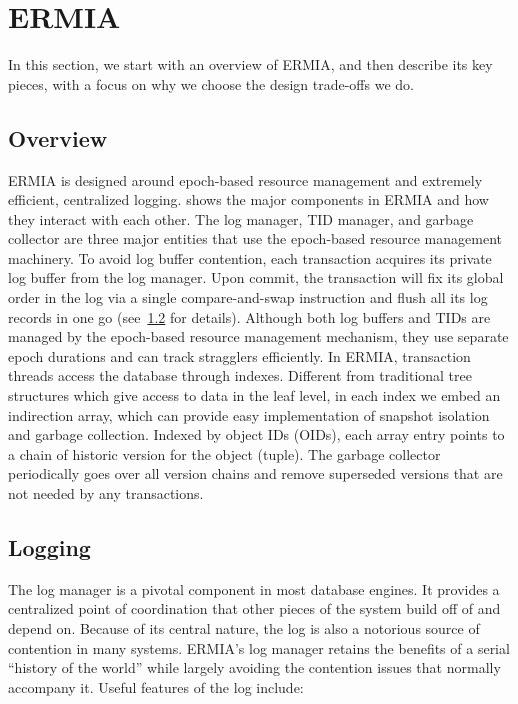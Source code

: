 
\section{ERMIA}
In this section, we start with an overview of ERMIA, and then describe its key pieces, with a focus on why we choose the design trade-offs we do.

\subsection{Overview}
ERMIA is designed around epoch-based resource management and extremely efficient, centralized logging.  shows the major components in ERMIA and how they interact with each other. The log manager, TID manager, and garbage collector are three major entities that use the epoch-based resource management machinery. To avoid log buffer contention, each transaction acquires its private log buffer from the log manager. Upon commit, the transaction will fix its global order in the log via a single compare-and-swap instruction and flush all its log records in one go (see~\ref{subsec:logging} for details). Although both log buffers and TIDs are managed by the epoch-based resource management mechanism, they use separate epoch durations and can track stragglers efficiently. In ERMIA, transaction threads access the database through indexes. Different from traditional tree structures which give access to data in the leaf level, in each index we embed an indirection array, which can provide easy implementation of snapshot isolation and garbage collection. Indexed by object IDs (OIDs), each array entry points to a chain of historic version for the object (tuple). The garbage collector periodically goes over all version chains and remove superseded versions that are not needed by any transactions.

\subsection{Logging}
\label{subsec:logging}
The log manager is a pivotal component in most database engines. It provides a centralized point of coordination that other pieces of the system build off of and depend on. Because of its central nature, the log is also a notorious source of contention in many systems. ERMIA's log manager retains the benefits of a serial ``history of the world'' while largely avoiding the contention issues that normally accompany it. Useful features of the log include:

